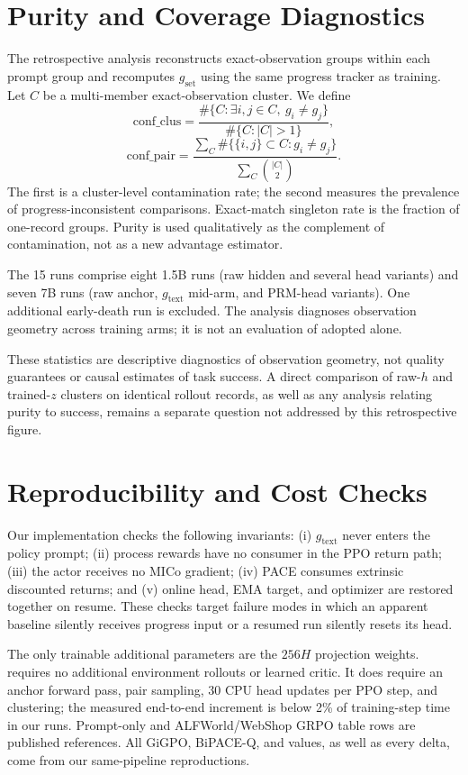 \section{Purity and Coverage Diagnostics}
\label{app:purity}

The retrospective analysis reconstructs exact-observation groups within each prompt group and recomputes $g_{\mathrm{set}}$ using the same progress tracker as training. Let $C$ be a multi-member exact-observation cluster. We define
\begin{equation}
\mathrm{conf\_clus}=
\frac{\#\{C:\exists i,j\in C,\ g_i\neq g_j\}}
{\#\{C:|C|>1\}},
\end{equation}
\begin{equation}
\mathrm{conf\_pair}=
\frac{\sum_C\#\{\{i,j\}\subset C:g_i\neq g_j\}}
{\sum_C\binom{|C|}{2}}.
\end{equation}
The first is a cluster-level contamination rate; the second measures the prevalence of progress-inconsistent comparisons. Exact-match singleton rate is the fraction of one-record groups. Purity is used qualitatively as the complement of contamination, not as a new advantage estimator.

The 15 runs comprise eight 1.5B runs (raw hidden and several head variants) and seven 7B runs (raw anchor, $g_{\mathrm{text}}$ mid-arm, and PRM-head variants). One additional early-death run is excluded. The analysis diagnoses observation geometry across training arms; it is not an evaluation of adopted \method alone.

These statistics are descriptive diagnostics of observation geometry, not quality guarantees or causal estimates of task success. A direct comparison of raw-$h$ and trained-$z$ clusters on identical rollout records, as well as any analysis relating purity to success, remains a separate question not addressed by this retrospective figure.

\section{Reproducibility and Cost Checks}
\label{app:repro}

Our implementation checks the following invariants: (i) $g_{\mathrm{text}}$ never enters the policy prompt; (ii) process rewards have no consumer in the PPO return path; (iii) the actor receives no MICo gradient; (iv) PACE consumes extrinsic discounted returns; and (v) online head, EMA target, and optimizer are restored together on resume. These checks target failure modes in which an apparent baseline silently receives progress input or a resumed run silently resets its head.

The only trainable additional parameters are the $256H$ projection weights. \method requires no additional environment rollouts or learned critic. It does require an anchor forward pass, pair sampling, 30 CPU head updates per PPO step, and clustering; the measured end-to-end increment is below 2\% of training-step time in our runs. Prompt-only and ALFWorld/WebShop GRPO table rows are published references. All GiGPO, BiPACE-Q, and \method values, as well as every \method delta, come from our same-pipeline reproductions.
